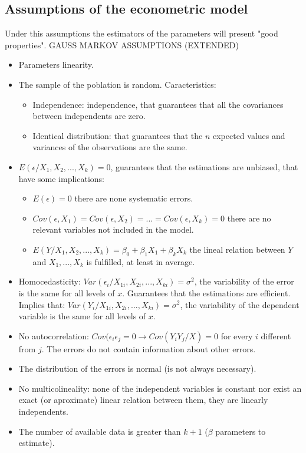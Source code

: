 \documentclass[10pt,landscape]{article}
\begin{document}
\begin{multicols}{3}
\subsection*{Assumptions of the econometric model}
Under this assumptions the estimators of the parameters will present "good properties". GAUSS MARKOV ASSUMPTIONS (EXTENDED)
\begin{itemize}
\item Parameters linearity.
\item The sample of the poblation is random. Caracteristics:
\begin{itemize}
\item Independence: independence, that guarantees that all the covariances between independents are zero.
\item Identical distribution: that guarantees that the $n$ expected values and variances of the observations are the same.
\end{itemize}
\item $E(\epsilon / X_1, X_2, ..., X_k) = 0$, guarantees that the estimations are unbiased, that have some implications:
\begin{itemize}
\item $E(\epsilon) = 0$ there are none systematic errors.
\item $Cov(\epsilon, X_1) = Cov(\epsilon, X_2) = ... = Cov(\epsilon, X_k) = 0$ there are no relevant variables not included in the model.
\item $E(Y/X_1, X_2, ..., X_k) = \beta_0 + \beta_1 X_1 + \beta_k X_k$ the lineal relation between $Y$ and $X_1, ..., X_k$ is fulfilled, at least in average.
\end{itemize}
\item Homocedasticity: $Var(\epsilon_i / X_{1i}, X_{2i}, ..., X_{ki}) = \sigma^2$, the variability of the error is the same for all levels of $x$. Guarantees that the estimations are efficient. Implies that: $Var(Y_i / X_{1i}, X_{2i}, ..., X_{ki}) = \sigma^2$, the variability of the dependent variable is the same for all levels of $x$.
\item No autocorrelation: $Cov(\epsilon_i \epsilon_j = 0 \rightarrow Cov(Y_i Y_j / X) = 0$ for every $i$ different from $j$. The errors do not contain information about other errors.
\item The distribution of the errors is normal (is not always necessary).
\item No multicolineality: none of the independent variables is constant nor exist an exact (or aproximate) linear relation between them, they are linearly independents.
\item The number of available data is greater than $k+1$ ($\beta$ parameters to estimate).
\end{itemize}


\end{multicols}
\end{document}

